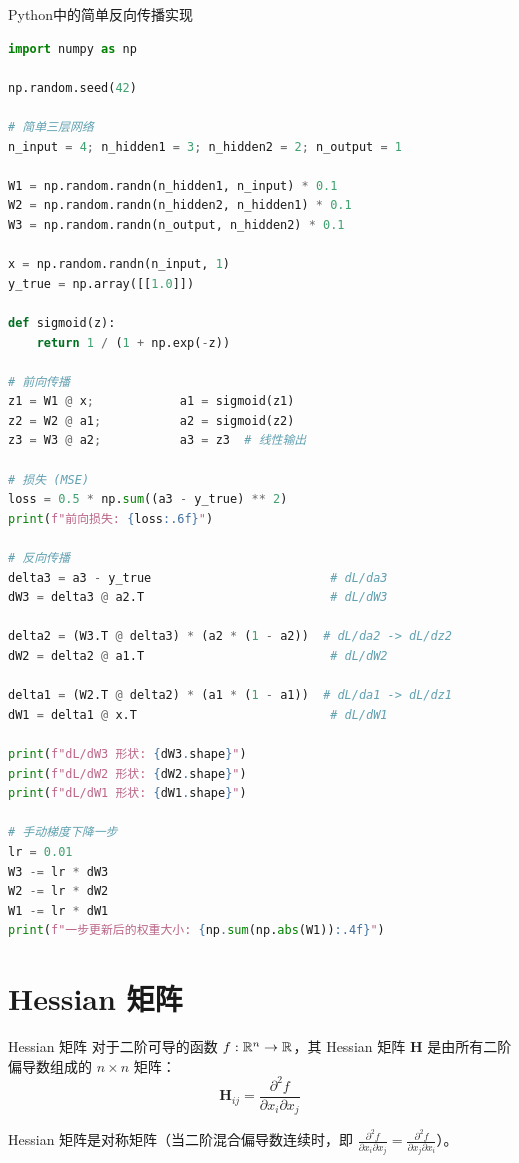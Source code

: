 \begin{mycode}{Python中的简单反向传播实现}
\begin{lstlisting}[language=Python]
import numpy as np

np.random.seed(42)

# 简单三层网络
n_input = 4; n_hidden1 = 3; n_hidden2 = 2; n_output = 1

W1 = np.random.randn(n_hidden1, n_input) * 0.1
W2 = np.random.randn(n_hidden2, n_hidden1) * 0.1
W3 = np.random.randn(n_output, n_hidden2) * 0.1

x = np.random.randn(n_input, 1)
y_true = np.array([[1.0]])

def sigmoid(z):
    return 1 / (1 + np.exp(-z))

# 前向传播
z1 = W1 @ x;            a1 = sigmoid(z1)
z2 = W2 @ a1;           a2 = sigmoid(z2)
z3 = W3 @ a2;           a3 = z3  # 线性输出

# 损失 (MSE)
loss = 0.5 * np.sum((a3 - y_true) ** 2)
print(f"前向损失: {loss:.6f}")

# 反向传播
delta3 = a3 - y_true                         # dL/da3
dW3 = delta3 @ a2.T                          # dL/dW3

delta2 = (W3.T @ delta3) * (a2 * (1 - a2))  # dL/da2 -> dL/dz2
dW2 = delta2 @ a1.T                          # dL/dW2

delta1 = (W2.T @ delta2) * (a1 * (1 - a1))  # dL/da1 -> dL/dz1
dW1 = delta1 @ x.T                           # dL/dW1

print(f"dL/dW3 形状: {dW3.shape}")
print(f"dL/dW2 形状: {dW2.shape}")
print(f"dL/dW1 形状: {dW1.shape}")

# 手动梯度下降一步
lr = 0.01
W3 -= lr * dW3
W2 -= lr * dW2
W1 -= lr * dW1
print(f"一步更新后的权重大小: {np.sum(np.abs(W1)):.4f}")
\end{lstlisting}
\end{mycode}

\section{Hessian 矩阵}

\begin{mydefinition}{Hessian 矩阵}
对于二阶可导的函数 $f:\mathbb{R}^n\to\mathbb{R}$，其 Hessian 矩阵 $\mathbf{H}$ 是由所有二阶偏导数组成的 $n\times n$ 矩阵：
\[
\mathbf{H}_{ij} = \frac{\partial^2 f}{\partial x_i \partial x_j}
\]
\end{mydefinition}

Hessian 矩阵是对称矩阵（当二阶混合偏导数连续时，即 $\frac{\partial^2 f}{\partial x_i\partial x_j}=\frac{\partial^2 f}{\partial x_j\partial x_i}$）。

